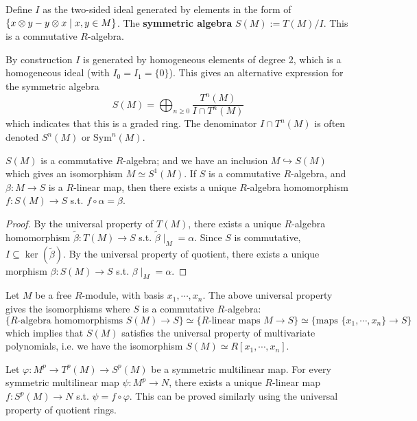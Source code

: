 \begin{definition}
    Define $I$ as the two-sided ideal generated by elements in the form of $\{x \otimes y - y \otimes x \mid x, y \in M\}$. The \textbf{symmetric algebra} $S(M) := T(M)/I$. This is a commutative $R$-algebra.
\end{definition}

\begin{remark}
    By construction $I$ is generated by homogeneous elements of degree 2, which is a homogeneous ideal (with $I_0 = I_1 = \{0\}$). This gives an alternative expression for the symmetric algebra 
    \[
        S(M) = \bigoplus_{n \geq 0} \frac{T^n(M)}{I \cap T^n(M)}
    \]
    which indicates that this is a graded ring. The denominator $I \cap T^n(M)$ is often denoted $S^n(M)$ or $\text{Sym}^n(M)$.
\end{remark}

\begin{proposition}
    $S(M)$ is a commutative $R$-algebra; and we have an inclusion $M \hookrightarrow S(M)$ which gives an isomorphism $M \simeq S^1(M)$. If $S$ is a commutative $R$-algebra, and $\beta: M \to S$ is a $R$-linear map, then there exists a unique $R$-algebra homomorphism $f: S(M) \to S$ s.t. $f \circ \alpha = \beta$.   
\end{proposition}

\begin{proof}
    By the universal property of $T(M)$, there exists a unique $R$-algebra homomorphism $\tilde{\beta}: T(M) \to S$ s.t. $\tilde{\beta} \mid_M = \alpha$. Since $S$ is commutative, $I \subseteq \ker (\tilde{\beta})$. By the universal property of quotient, there exists a unique morphism $\beta: S(M) \to S$ s.t. $\beta\mid_M = \alpha$.
\end{proof}

\begin{example}
    Let $M$ be a free $R$-module, with basis $x_1, \cdots, x_n$. The above universal property gives the isomorphisms where $S$ is a commutative $R$-algebra:
    \[
        \{ \text{$R$-algebra homomorphisms } S(M) \to S\} \simeq \{\text{$R$-linear maps $M \to S$}\} \simeq \{\text{maps } \{ x_1, \cdots, x_n \} \to S\}
    \]
    which implies that $S(M)$ satisfies the universal property of multivariate polynomials, i.e. we have the isomorphism $S(M) \simeq R[x_1, \cdots, x_n]$.
\end{example}

\begin{example}
    Let $\varphi: M^p \to T^p(M) \to S^p(M)$ be a symmetric multilinear map. For every symmetric multilinear map $\psi: M^p \to N$, there exists a unique $R$-linear map $f: S^p(M) \to N$ s.t. $\psi = f \circ \varphi$. This can be proved similarly using the universal property of quotient rings.
\end{example}

